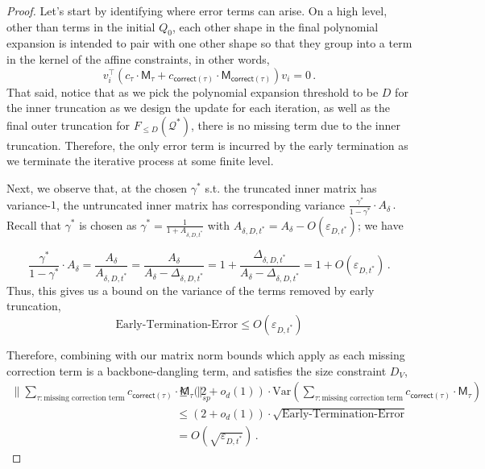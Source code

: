 \documentclass[12pt]{article}
\newcommand{\Var}{\mathrm{Var}}
\newcommand{\calQ}{\mathcal{Q}}
\newcommand{\gam}{\gamma}
\newcommand{\cm}{\mathsf{M} }
\newcommand{\corr}{\mathsf{correct}}
\begin{document}
\begin{proof}
	
Let's start by identifying where error terms can arise. On a high level, other than terms in the initial $Q_0$, each other shape in the final polynomial expansion is intended to pair with one other shape so that they group into a term in the kernel of the affine constraints, in other words, \[
 v_i^\top (c_\tau \cdot \cm_\tau + c_{\corr(\tau)} \cdot \cm_{\corr(\tau)}) v_i = 0
\,.\]
That said, notice that as we pick the polynomial expansion threshold to be $D$ for the inner truncation as we design the update for each iteration, as well as the final outer truncation for $F_{\leq D}(\calQ^*)$, there is no missing term due to the inner truncation.  Therefore, the only error term is incurred by the early termination as we terminate the iterative process at some finite level.

Next, we observe that, at the chosen $\gam^*$ s.t. the truncated inner matrix has variance-$1$, the untruncated inner matrix has corresponding variance \(
\frac{\gam^*}{1-\gam^*} \cdot A_\delta \,.
 \)
Recall that $\gam^*$ is chosen as \(
\gam^* = \frac{1}{1+ A_{\delta,D,t^*}} 
 \) with \( A_{\delta,D,t^*} = A_\delta - O(\varepsilon_{D,t^*}) \); we have

\[
    \frac{\gam^*}{1-\gam^*}\cdot A_\delta
    =
    \frac{A_\delta}{A_{\delta,D,t^*}}
    =
    \frac{A_\delta}{A_\delta-\Delta_{\delta,D,t^*}}
    =
    1+
    \frac{\Delta_{\delta,D,t^*}}
         {A_\delta-\Delta_{\delta,D,t^*}}
    =
    1+O(\varepsilon_{D,t^*})\,.
\]
Thus, this gives us a bound on the variance of the terms removed by early truncation, \[ 
\text{Early-Termination-Error} \leq O(\varepsilon_{D,t^*})
\]

Therefore, combining with our matrix norm bounds which apply as each missing correction term is a backbone-dangling term, and satisfies the size constraint $D_V$, \begin{align*}
	\|\sum_{\tau: \text{missing correction term}} c_{\corr(\tau)} \cdot \cm_{\tau} \|_{sp}  &\leq (2+o_d(1)) \cdot \Var( \sum_{\tau: \text{missing correction term}} c_{\corr(\tau)} \cdot \cm_{\tau}) \\
	&\leq (2+o_d(1))\cdot   \sqrt{\text{Early-Termination-Error}} \\
	&=  O(\sqrt{\varepsilon_{D,t^*}}) \,.
\end{align*} 
\end{proof}

\end{document}
